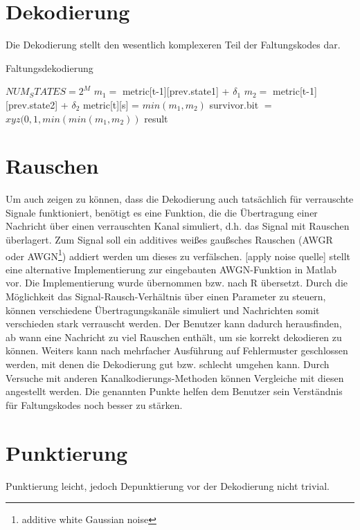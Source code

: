 \section{Dekodierung}
\label{kapitel:implementierung_dekodierung}
Die Dekodierung stellt den wesentlich komplexeren Teil der Faltungskodes dar. 

\begin{algorithm}[H]
\renewcommand{\algorithmicforall}{\textbf{for each}}
\caption{Faltungsdekodierung}
\label{algorithmus:dekodierung}
\begin{algorithmic}[1]
\STATE $NUM_STATES=2^{M}$
   	\STATE $m_{1}=$ metric[t-1][prev.state1] + $\delta_{1}$
   	\STATE $m_{2}=$ metric[t-1][prev.state2] + $\delta_{2}$
      \STATE metric[t][s] = $min(m_{1},m_{2})$
      \STATE survivor.bit $=$ $xyz(0,1,min(min(m_{1},m_{2}))$
	\ENDFOR
\ENDFOR
\RETURN result
\end{algorithmic}
\end{algorithm}

\section{Rauschen}
\label{kapitel:implementierung_noise}
Um auch zeigen zu können, dass die Dekodierung auch tatsächlich für verrauschte Signale funktioniert, benötigt es eine Funktion, die die Übertragung einer Nachricht über einen verrauschten Kanal simuliert, d.h. das Signal mit Rauschen überlagert. Zum Signal soll ein additives weißes gaußsches Rauschen (AWGR oder AWGN\footnote{additive white Gaussian noise}) addiert werden um dieses zu verfälschen. [apply noise quelle] stellt eine alternative Implementierung zur eingebauten AWGN-Funktion in Matlab vor. Die Implementierung wurde übernommen bzw. nach R übersetzt. Durch die Möglichkeit das Signal-Rausch-Verhältnis über einen Parameter zu steuern, können verschiedene Übertragungskanäle simuliert und Nachrichten somit verschieden stark verrauscht werden. Der Benutzer kann dadurch herausfinden, ab wann eine Nachricht zu viel Rauschen enthält, um sie korrekt dekodieren zu können. Weiters kann nach mehrfacher Ausführung auf Fehlermuster geschlossen werden, mit denen die Dekodierung gut bzw. schlecht umgehen kann. Durch Versuche mit anderen Kanalkodierungs-Methoden können Vergleiche mit diesen angestellt werden. Die genannten Punkte helfen dem Benutzer sein Verständnis für Faltungskodes noch besser zu stärken.

\section{Punktierung}
\label{kapitel:implementierung_punktierung}
Punktierung leicht, jedoch Depunktierung vor der Dekodierung nicht trivial.

